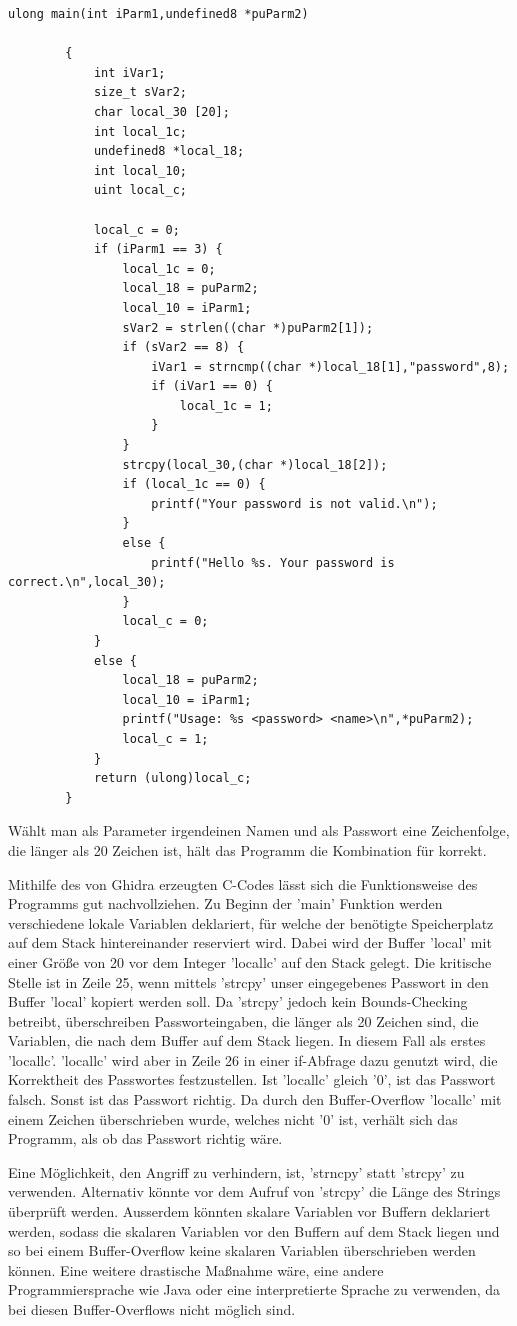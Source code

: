 \documentclass[12pt,a4paper]{article}
\begin{document}
	\begin{lstlisting}[style=CStyle]
		ulong main(int iParm1,undefined8 *puParm2)
		
		{
			int iVar1;
			size_t sVar2;
			char local_30 [20];
			int local_1c;
			undefined8 *local_18;
			int local_10;
			uint local_c;
			
			local_c = 0;
			if (iParm1 == 3) {
				local_1c = 0;
				local_18 = puParm2;
				local_10 = iParm1;
				sVar2 = strlen((char *)puParm2[1]);
				if (sVar2 == 8) {
					iVar1 = strncmp((char *)local_18[1],"password",8);
					if (iVar1 == 0) {
						local_1c = 1;
					}
				}
				strcpy(local_30,(char *)local_18[2]);
				if (local_1c == 0) {
					printf("Your password is not valid.\n");
				}
				else {
					printf("Hello %s. Your password is correct.\n",local_30);
				}
				local_c = 0;
			}
			else {
				local_18 = puParm2;
				local_10 = iParm1;
				printf("Usage: %s <password> <name>\n",*puParm2);
				local_c = 1;
			}
			return (ulong)local_c;
		}
	\end{lstlisting}
	\bigskip
	
	Wählt man als Parameter irgendeinen Namen und als Passwort eine Zeichenfolge, die länger als 20
	Zeichen ist, hält das Programm die Kombination für korrekt.
	\bigskip
	
	Mithilfe des von Ghidra erzeugten C-Codes lässt sich die Funktionsweise des Programms gut nachvollziehen.
	Zu Beginn der 'main' Funktion werden verschiedene lokale Variablen deklariert, für welche 
	der benötigte Speicherplatz auf dem Stack hintereinander reserviert wird.
	Dabei wird der Buffer 'local' mit einer Größe von 20 vor dem Integer 'local\textunderscore lc' 
	auf den Stack gelegt.
	Die kritische Stelle ist in Zeile 25, wenn mittels 'strcpy' unser eingegebenes Passwort 
	in den Buffer 'local' kopiert werden soll. Da 'strcpy' jedoch kein Bounds-Checking 
	betreibt, überschreiben Passworteingaben, die länger als 20 Zeichen sind, die Variablen, 
	die nach dem Buffer auf dem Stack liegen. In diesem Fall als erstes 'local\textunderscore lc'. 
	'local\textunderscore lc' wird aber in Zeile 26 in einer if-Abfrage dazu genutzt wird, die Korrektheit 
	des Passwortes festzustellen. 
	Ist 'local\textunderscore lc' gleich '0', ist das Passwort falsch. Sonst ist das Passwort richtig. 
	Da durch den Buffer-Overflow 'local\textunderscore lc' mit einem Zeichen überschrieben wurde, 
	welches nicht '0' ist, verhält sich das Programm, als ob das Passwort richtig wäre.
	\bigskip
	
	Eine Möglichkeit, den Angriff zu verhindern, ist, 'strncpy' statt 'strcpy' zu verwenden.
	Alternativ könnte vor dem Aufruf von 'strcpy' die Länge des Strings überprüft werden.
	Ausserdem könnten skalare Variablen vor Buffern deklariert werden, sodass die skalaren 
	Variablen vor den Buffern auf dem Stack liegen und so bei einem Buffer-Overflow keine 
	skalaren Variablen überschrieben werden können. 
	Eine weitere drastische Maßnahme wäre, eine andere Programmiersprache wie Java oder eine 
	interpretierte Sprache zu verwenden, da bei diesen Buffer-Overflows nicht möglich sind.
	\bigskip
	
\end{document}
